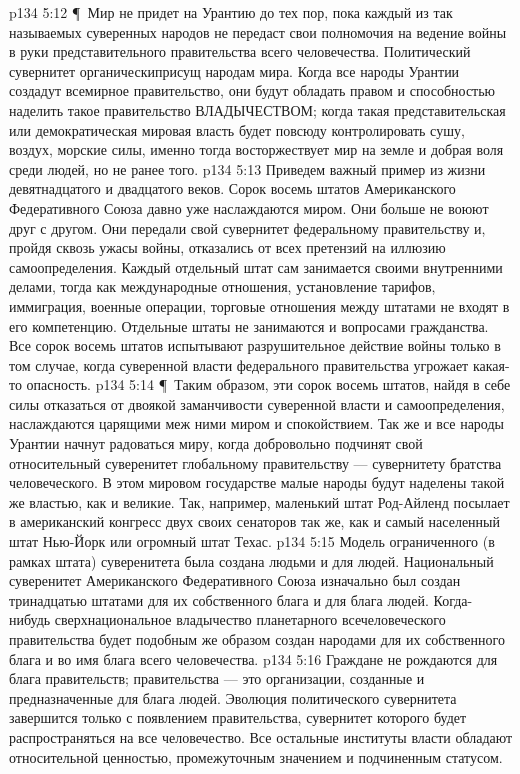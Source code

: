\vs p134 5:12 \P\ Мир не придет на Урантию до тех пор, пока каждый из так называемых суверенных народов не передаст свои полномочия на ведение войны в руки представительного правительства всего человечества. Политический сувернитет органическиприсущ народам мира. Когда все народы Урантии создадут всемирное правительство, они будут обладать правом и способностью наделить такое правительство ВЛАДЫЧЕСТВОМ; когда такая представительская или демократическая мировая власть будет повсюду контролировать сушу, воздух, морские силы, именно тогда восторжествует мир на земле и добрая воля среди людей, но не ранее того.
\vs p134 5:13 Приведем важный пример из жизни девятнадцатого и двадцатого веков. Сорок восемь штатов Американского Федеративного Союза давно уже наслаждаются миром. Они больше не воюют друг с другом. Они передали свой сувернитет федеральному правительству и, пройдя сквозь ужасы войны, отказались от всех претензий на иллюзию самоопределения. Каждый отдельный штат сам занимается своими внутренними делами, тогда как международные отношения, установление тарифов, иммиграция, военные операции, торговые отношения между штатами не входят в его компетенцию. Отдельные штаты не занимаются и вопросами гражданства. Все сорок восемь штатов испытывают разрушительное действие войны только в том случае, когда суверенной власти федерального правительства угрожает какая\hyp{}то опасность.
\vs p134 5:14 \P\ Таким образом, эти сорок восемь штатов, найдя в себе силы отказаться от двоякой заманчивости суверенной власти и самоопределения, наслаждаются царящими меж ними миром и спокойствием. Так же и все народы Урантии начнут радоваться миру, когда добровольно подчинят свой относительный суверенитет глобальному правительству --- сувернитету братства человеческого. В этом мировом государстве малые народы будут наделены такой же властью, как и великие. Так, например, маленький штат Род\hyp{}Айленд посылает в американский конгресс двух своих сенаторов так же, как и самый населенный штат Нью\hyp{}Йорк или огромный штат Техас.
\vs p134 5:15 Модель ограниченного (в рамках штата) суверенитета была создана людьми и для людей. Национальный суверенитет Американского Федеративного Союза изначально был создан тринадцатью штатами для их собственного блага и для блага людей. Когда\hyp{}нибудь сверхнациональное владычество планетарного всечеловеческого правительства будет подобным же образом создан народами для их собственного блага и во имя блага всего человечества.
\vs p134 5:16 Граждане не рождаются для блага правительств; правительства --- это организации, созданные и предназначенные для блага людей. Эволюция политического сувернитета завершится только с появлением правительства, сувернитет которого будет распространяться на все человечество. Все остальные институты власти обладают относительной ценностью, промежуточным значением и подчиненным статусом.
